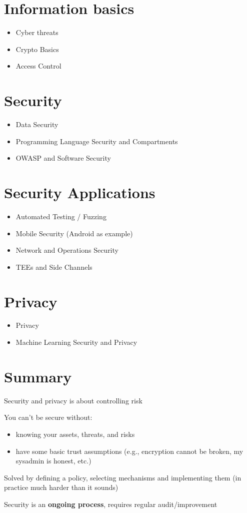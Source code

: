 \documentclass[11pt]{article}
\begin{document}
\section*{Information basics}
\begin{itemize}
	\item Cyber threats
	\item Crypto Basics
	\item Access Control
\end{itemize}

\section*{Security}
\begin{itemize}
	\item Data Security
	\item Programming Language Security and Compartments
	\item OWASP and Software Security
\end{itemize}

\section*{Security Applications}
\begin{itemize}
	\item Automated Testing / Fuzzing
	\item Mobile Security (Android as example)
	\item Network and Operations Security
	\item TEEs and Side Channels
\end{itemize}

\section*{Privacy}
\begin{itemize}
	\item Privacy
	\item Machine Learning Security and Privacy
\end{itemize}

\section*{Summary}

Security and privacy is about controlling risk

You can't be secure without: 
\begin{itemize}
	\item knowing your assets, threats, and risks
	\item have some basic trust assumptions (e.g., encryption cannot be broken, my sysadmin is honest, etc.) 
\end{itemize}

Solved by defining a policy, selecting mechanisms and implementing them (in practice much harder than it sounds) 

Security is an \textbf{ongoing process}, requires regular audit/improvement
\end{document}
